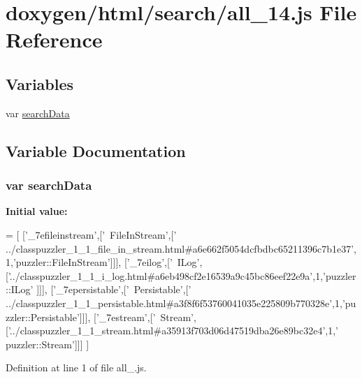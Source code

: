 \hypertarget{a00046}{}\section{doxygen/html/search/all\+\_\+14.js File Reference}
\label{a00046}
\subsection*{Variables}
\begin{DoxyCompactItemize}
\item 
var \hyperlink{a00046_ad01a7523f103d6242ef9b0451861231e}{search\+Data}
\end{DoxyCompactItemize}


\subsection{Variable Documentation}
\hypertarget{a00046_ad01a7523f103d6242ef9b0451861231e}{}
\subsubsection[{search\+Data}]{\setlength{\rightskip}{0pt plus 5cm}var search\+Data}\label{a00046_ad01a7523f103d6242ef9b0451861231e}
{\bfseries Initial value\+:}
\begin{DoxyCode}
=
[
  [\textcolor{stringliteral}{'\_7efileinstream'},[\textcolor{stringliteral}{'~FileInStream'},[\textcolor{stringliteral}{'
      ../classpuzzler\_1\_1\_file\_in\_stream.html#a6e662f5054dcfbdbc65211396c7b1e37'},1,\textcolor{stringliteral}{'puzzler::FileInStream'}]]],
  [\textcolor{stringliteral}{'\_7eilog'},[\textcolor{stringliteral}{'~ILog'},[\textcolor{stringliteral}{'../classpuzzler\_1\_1\_i\_log.html#a6eb498cf2e16539a9c45bc86eef22e9a'},1,\textcolor{stringliteral}{'puzzler::ILog'}
      ]]],
  [\textcolor{stringliteral}{'\_7epersistable'},[\textcolor{stringliteral}{'~Persistable'},[\textcolor{stringliteral}{'
      ../classpuzzler\_1\_1\_persistable.html#a3f8f6f53760041035e225809b770328e'},1,\textcolor{stringliteral}{'puzzler::Persistable'}]]],
  [\textcolor{stringliteral}{'\_7estream'},[\textcolor{stringliteral}{'~Stream'},[\textcolor{stringliteral}{'../classpuzzler\_1\_1\_stream.html#a35913f703d06d47519dba26e89bc32e4'},1,\textcolor{stringliteral}{'
      puzzler::Stream'}]]]
]
\end{DoxyCode}


Definition at line 1 of file all\+\_.\+js.

